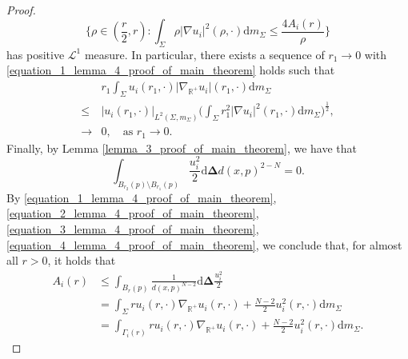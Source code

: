 \documentclass{article}
\theoremstyle{remark}
\numberwithin{equation}{section}
\theoremstyle{definition}
\begin{document}
\begin{proof}
    	\begin{equation}
    		\{\rho \in (\frac{r}{2},r) : \int_{\Sigma} \rho \lvert \nabla u_{i} \rvert^{2}(\rho,\cdot) \mathrm{d}m_{\Sigma} \le \frac{4A_{i}(r)}{\rho}\}
    	\end{equation}
    	has positive $\mathcal{L}^{1}$ measure. In particular, there exists a sequence of $r_{1} \to 0$ with \eqref{equation_1_lemma_4_proof_of_main_theorem} holds such that
    	\begin{equation}\label{equation_3_lemma_4_proof_of_main_theorem}
    		\begin{split}
    			& r_{1} \int_{\Sigma} u_{i}(r_{1},\cdot) \lvert \nabla_{\mathbb{R}^{+}}u_{i}\rvert(r_{1},\cdot) \mathrm{d}m_{\Sigma}\\
    			\le & \lvert u_{i}(r_{1},\cdot) \rvert_{L^{2}(\Sigma,m_{\Sigma})} \Big(\int_{\Sigma} r_{1}^{2} \lvert \nabla u_{i} \rvert^{2}(r_{1},\cdot) \mathrm{d}m_{\Sigma}\Big)^{\frac{1}{2}},\\
    			\to& 0,\quad \text{as } r_{1} \to 0.
    		\end{split}
    	\end{equation}
    	Finally, by Lemma \ref{lemma_3_proof_of_main_theorem}, we have that
    	\begin{equation}\label{equation_4_lemma_4_proof_of_main_theorem}
    		\int_{B_{r_{2}}(p)\setminus B_{r_{1}}(p)} \frac{u_{i}^{2}}{2} \mathrm{d}\mathbf{\Delta} d(x,p)^{2-N} = 0.
    	\end{equation}
    	By \eqref{equation_1_lemma_4_proof_of_main_theorem}, \eqref{equation_2_lemma_4_proof_of_main_theorem}, \eqref{equation_3_lemma_4_proof_of_main_theorem},\eqref{equation_4_lemma_4_proof_of_main_theorem}, we conclude that, for almost all $r > 0$, it holds that
    	\begin{equation}
    		\begin{split}
    			A_{i}(r) & \le \int_{B_{r}(p)} \frac{1}{d(x,p)^{N-2}} \mathrm{d}\mathbf{\Delta} \frac{u_{i}^{2}}{2}\\
    			& = \int_{\Sigma} ru_{i}(r,\cdot) \nabla_{\mathbb{R}^{+}} u_{i}(r,\cdot) + \frac{N-2}{2} u_{i}^{2}(r,\cdot) \mathrm{d}m_{\Sigma}\\
    			& = \int_{\Gamma_{i}(r)} ru_{i}(r,\cdot) \nabla_{\mathbb{R}^{+}} u_{i}(r,\cdot) + \frac{N-2}{2} u_{i}^{2}(r,\cdot) \mathrm{d}m_{\Sigma}.
    		\end{split}
    	\end{equation}
    \end{proof}
\end{document}
